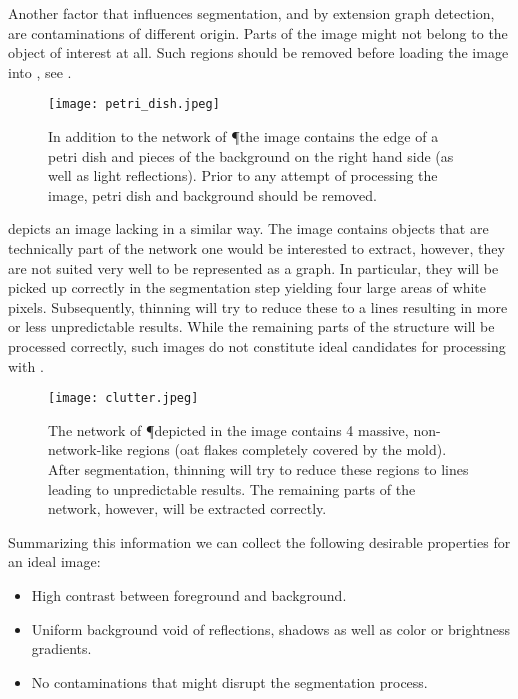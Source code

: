 
	Another factor that influences segmentation, and by extension graph detection, are contaminations of different origin. Parts of the image might not belong to the object of interest at all. Such regions should be removed before loading the image into \NEFI, see . 

	\begin{figure}
		\centering
		\texttt{[image: petri\_dish.jpeg]}
		\caption[\NEFIs caveats: Non-network objects]{In addition to the network of \P the image contains the edge of a petri dish and pieces of the background on the right hand side (as well as light reflections). Prior to any attempt of processing the image, petri dish and background should be removed.}
		\label{fig:sup:petri_dish}
	\end{figure}

	 depicts an image lacking in a similar way. The image contains objects that are technically part of the network one would be interested to extract, however, they are not suited very well to be represented as a graph. In particular, they will be picked up correctly in the segmentation step yielding four large areas of white pixels. Subsequently, thinning will try to reduce these to a lines resulting in more or less unpredictable results. While the remaining parts of the structure will be processed correctly, such images do not constitute ideal candidates for processing with \NEFI.

	\begin{figure}
		\centering
		\texttt{[image: clutter.jpeg]}
		\caption[\NEFIs caveats: Non-network objects]{The network of \P depicted in the image contains 4 massive, non-network-like regions (oat flakes completely covered by the mold). After segmentation, thinning will try to reduce these regions to lines leading to unpredictable results. The remaining parts of the network, however, will be extracted correctly.}
		\label{fig:sup:clutter}
	\end{figure}

	Summarizing this information we can collect the following desirable properties for an ideal image:

	\begin{itemize}
		\item High contrast between foreground and background.
		\item Uniform background void of reflections, shadows as well as color or brightness gradients.
		\item No contaminations that might disrupt the segmentation process.
	\end{itemize}

